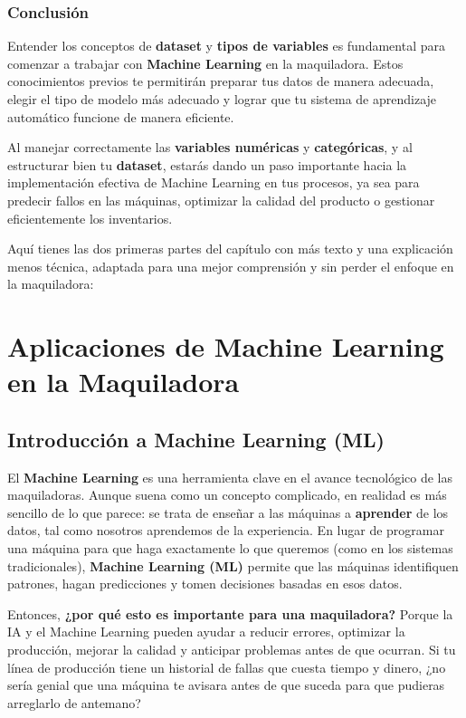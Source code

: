 \documentclass[
  10pt,
  letterpaper,
]{book}
\begin{document}
\subsubsection{Conclusión}\label{conclusiuxf3n}

Entender los conceptos de \textbf{dataset} y \textbf{tipos de variables}
es fundamental para comenzar a trabajar con \textbf{Machine Learning} en
la maquiladora. Estos conocimientos previos te permitirán preparar tus
datos de manera adecuada, elegir el tipo de modelo más adecuado y lograr
que tu sistema de aprendizaje automático funcione de manera eficiente.

Al manejar correctamente las \textbf{variables numéricas} y
\textbf{categóricas}, y al estructurar bien tu \textbf{dataset}, estarás
dando un paso importante hacia la implementación efectiva de Machine
Learning en tus procesos, ya sea para predecir fallos en las máquinas,
optimizar la calidad del producto o gestionar eficientemente los
inventarios.

Aquí tienes las dos primeras partes del capítulo con más texto y una
explicación menos técnica, adaptada para una mejor comprensión y sin
perder el enfoque en la maquiladora:

\section{Aplicaciones de Machine Learning en la
Maquiladora}\label{aplicaciones-de-machine-learning-en-la-maquiladora}

\subsection{\texorpdfstring{\textbf{Introducción a Machine Learning
(ML)}}{Introducción a Machine Learning (ML)}}\label{introducciuxf3n-a-machine-learning-ml}

El \textbf{Machine Learning} es una herramienta clave en el avance
tecnológico de las maquiladoras. Aunque suena como un concepto
complicado, en realidad es más sencillo de lo que parece: se trata de
enseñar a las máquinas a \textbf{aprender} de los datos, tal como
nosotros aprendemos de la experiencia. En lugar de programar una máquina
para que haga exactamente lo que queremos (como en los sistemas
tradicionales), \textbf{Machine Learning (ML)} permite que las máquinas
identifiquen patrones, hagan predicciones y tomen decisiones basadas en
esos datos.

Entonces, \textbf{¿por qué esto es importante para una maquiladora?}
Porque la IA y el Machine Learning pueden ayudar a reducir errores,
optimizar la producción, mejorar la calidad y anticipar problemas antes
de que ocurran. Si tu línea de producción tiene un historial de fallas
que cuesta tiempo y dinero, ¿no sería genial que una máquina te avisara
antes de que suceda para que pudieras arreglarlo de antemano?
\end{document}
